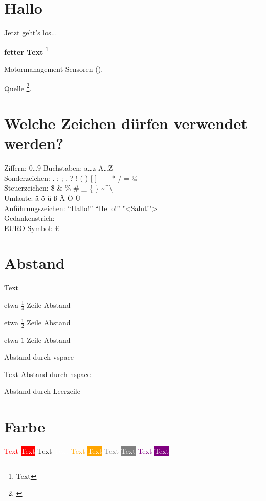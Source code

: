 \section*{Hallo} Jetzt geht's los...

\textbf{fetter Text} \footnote{Text}

Motormanagement Sensoren (\textcite{schneehage:2021:motormanagement}).

Quelle \footnote{\textcite{kofler:2018:hacking}}.

\section{Welche Zeichen dürfen verwendet werden?}

Ziffern: 0…9
Buchstaben: a…z A…Z\\
Sonderzeichen:  . : ; , ? ! ( ) [ ] + - * / = @\\
Steuerzeichen: \$ \& \% \# \_ \{ \} \textasciitilde \textasciicircum \textbackslash \textbar \\
Umlaute: ä ö ü ß Ä Ö Ü\\
Anführungszeichen: "`Hallo!"' ``Hello!'' "<Salut!">\\
Gedankenstrich: - -- \\
EURO-Symbol: \euro

\section{Abstand}

Text

\smallskip etwa $\frac{1}{4}$ Zeile Abstand

\medskip etwa $\frac{1}{2}$ Zeile Abstand

\bigskip etwa $1$ Zeile Abstand

\vspace{2ex} %

Abstand durch vspace

Text \hspace{2em} Abstand durch hspace%

Abstand durch Leerzeile

\section{Farbe}

\textcolor{red}{Text} \colorbox{red}{\textcolor{white}{Text}}
\textcolor{blau}{Text} \colorbox{blau}{\textcolor{white}{Text}}
\textcolor{orange}{Text} \colorbox{orange}{\textcolor{white}{Text}}
\textcolor{gray}{Text} \colorbox{gray}{\textcolor{white}{Text}}
\textcolor{purple}{Text} \colorbox{purple}{\textcolor{white}{Text}}


